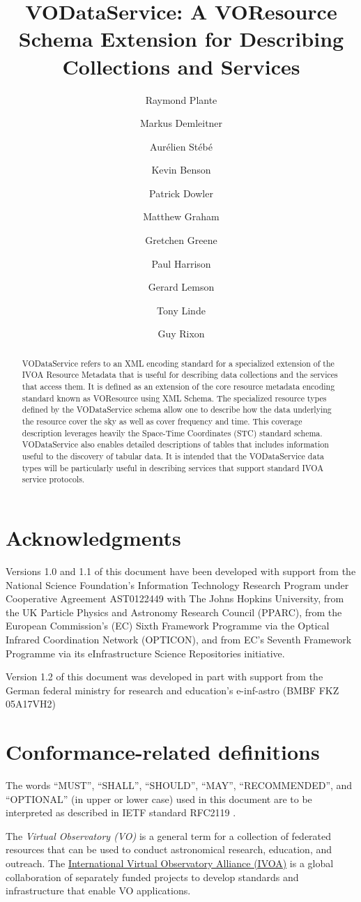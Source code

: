 \documentclass[11pt,a4paper]{ivoa}
\title{VODataService: A VOResource Schema Extension for Describing
Collections and Services}
\author[http://www.ivoa.net/twiki/bin/view/IVOA/RayPlante]{Raymond Plante}
\author[http://www.ivoa.net/twiki/bin/view/IVOA/MarkusDemleitner]{Markus Demleitner}
\author[http://www.ivoa.net/twiki/bin/view/IVOA/AurelienStebe]{Aurélien Stébé}
\author[http://www.ivoa.net/twiki/bin/view/IVOA/KevinBenson]{Kevin Benson}
\author[http://www.ivoa.net/twiki/bin/view/IVOA/PatrickDowler]{Patrick Dowler}
\author[http://www.ivoa.net/twiki/bin/view/IVOA/MatthewGraham]{Matthew Graham}
\author[http://www.ivoa.net/twiki/bin/view/IVOA/GretchenGreene]{Gretchen Greene}
\author[http://www.ivoa.net/twiki/bin/view/IVOA/PaulHarrison]{Paul Harrison}
\author[http://www.ivoa.net/twiki/bin/view/IVOA/GerardLemson]{Gerard Lemson}
\author[http://www.ivoa.net/twiki/bin/view/IVOA/TonyLinde]{Tony Linde}
\author[http://www.ivoa.net/twiki/bin/view/IVOA/GuyRixon]{Guy Rixon}
\begin{document}
\begin{abstract}
VODataService refers to an XML encoding standard for a specialized
extension of the IVOA Resource Metadata that is useful for describing
data collections and the services that access them.  It is defined as
an extension of the core resource metadata encoding standard known as
VOResource \citep{2008ivoa.spec.0222P} using XML Schema.
The specialized resource types defined by the VODataService schema
allow one to describe how the data underlying the resource cover the
sky as well as cover frequency and time.  This coverage description
leverages heavily the Space-Time Coordinates (STC) standard
schema.  VODataService also enables detailed
descriptions of tables that includes information useful to the
discovery of tabular data.  It is intended that the VODataService data
types will be particularly useful in describing services that support
standard IVOA service protocols.  
\end{abstract}

\section*{Acknowledgments}

Versions 1.0 and 1.1 of this document have been developed with support from the
National Science Foundation's
Information Technology Research Program under Cooperative Agreement
AST0122449 with The Johns Hopkins University, from the
UK Particle Physics and Astronomy
Research Council (PPARC), from the European Commission's (EC)
Sixth
Framework Programme via the 
Optical Infrared Coordination Network (OPTICON), and from EC's
Seventh Framework Programme
via its
eInfrastructure Science Repositories initiative.

Version 1.2 of this document was developed in part with support from the
German federal ministry for research and education's e-inf-astro (BMBF
FKZ 05A17VH2)


\section*{Conformance-related definitions}

The words ``MUST'', ``SHALL'', ``SHOULD'', ``MAY'', ``RECOMMENDED'', and
``OPTIONAL'' (in upper or lower case) used in this document are to be
interpreted as described in IETF standard RFC2119 \citep{std:RFC2119}.

The \emph{Virtual Observatory (VO)} is a
general term for a collection of federated resources that can be used
to conduct astronomical research, education, and outreach.
The \href{http://www.ivoa.net}{International
Virtual Observatory Alliance (IVOA)} is a global
collaboration of separately funded projects to develop standards and
infrastructure that enable VO applications.
\end{document}
